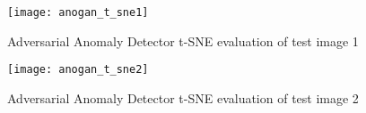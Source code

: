 \begin{figure}[htb]
  \centering
  \texttt{[image: anogan\_t\_sne1]}
  \caption[Adversarial Anomaly Detector t-SNE evaluation of test image 1]{Adversarial Anomaly Detector t-SNE evaluation of test image 1}
  \label{fig:anogan_eval_test_image_1}
\end{figure}

\begin{figure}[htb]
  \centering
  \texttt{[image: anogan\_t\_sne2]}
  \caption[Adversarial Anomaly Detector t-SNE evaluation of test image 2]{Adversarial Anomaly Detector t-SNE evaluation of test image 2}
  \label{fig:anogan_eval_test_image_2}
\end{figure}
